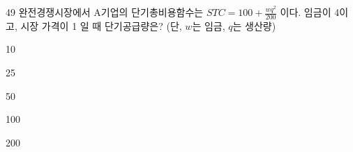 \begin{question}{49}
완전경쟁시장에서 A기업의 단기총비용함수는 $STC=100+\frac{wq^{2}}{200}$ 이다. 임금이 4이
고, 시장 가격이 1 일 때 단기공급량은? (단, $w$는 임금, $q$는 생산량) \par
\begin{choices}
  \item 10
  \item 25
  \item 50
  \item 100
  \item 200
\end{choices}
\end{question}

